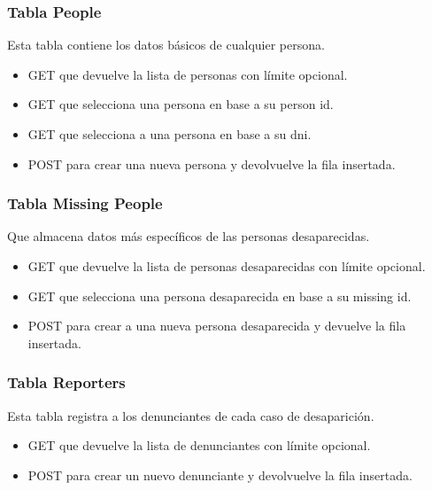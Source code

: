     \subsubsection{Tabla People}
        Esta tabla contiene los datos básicos de cualquier persona.
        \begin{itemize}
            \item GET que devuelve la lista de personas con límite opcional.
            \item GET que selecciona una persona en base a su person id.
            \item GET que selecciona a una persona en base a su dni.
            \item POST para crear una nueva persona y devolvuelve la fila insertada.
        \end{itemize}
        
    \subsubsection{Tabla Missing People}
        Que almacena datos más específicos de las personas desaparecidas.
        \begin{itemize}
            \item GET que devuelve la lista de personas desaparecidas con límite opcional.
            \item GET que selecciona una persona desaparecida en base a su missing id.
            \item POST para crear a una nueva persona desaparecida y devuelve la fila insertada.
        \end{itemize}
        
    \subsubsection{Tabla Reporters}
        Esta tabla registra a los denunciantes de cada caso de desaparición.
        \begin{itemize}
            \item GET que devuelve la lista de denunciantes con límite opcional.
            \item POST para crear un nuevo denunciante y devolvuelve la fila insertada.
        \end{itemize}

